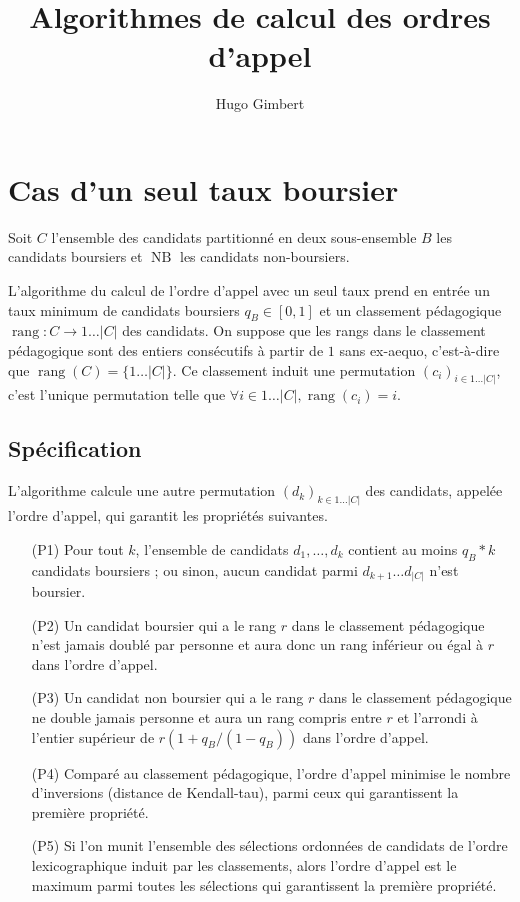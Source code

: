 \documentclass{article}
\DeclareMathOperator{\rang}{rang}
\DeclareMathOperator{\NB}{NB}
\begin{document}
\title{Algorithmes de calcul des ordres d'appel}
\author{Hugo Gimbert}
\maketitle


\section{Cas d'un seul taux boursier}

Soit $C$ l'ensemble des candidats partitionné en deux sous-ensemble
$B$ les candidats boursiers et $\NB$ les candidats non-boursiers.

L'algorithme du calcul de l'ordre d'appel avec un seul taux
prend en entrée un taux minimum de candidats boursiers
$q_B\in [0,1]$
et
un classement pédagogique $\rang:C \to 1\ldots |C|$
des candidats.
On suppose que les rangs dans le classement pédagogique
sont des entiers consécutifs à partir de $1$
sans ex-aequo, c'est-à-dire que $\rang(C)=\{1\ldots |C|\}$.
Ce classement induit une permutation $(c_i)_{i\in 1\ldots |C|}$,
c'est l'unique permutation telle que $\forall i\in 1\ldots |C|, \rang(c_i) = i$.


\subsection{Spécification}


L'algorithme calcule  une autre permutation
$(d_k)_{k\in 1\ldots |C|}$ des candidats, appelée l'ordre d'appel,
qui garantit les propriétés suivantes.
\begin{itemize}
 \item[(P1)]
 Pour tout $k$, l'ensemble de candidats $d_1,\ldots,d_k$ contient au moins $q_B  * k$  candidats boursiers ; ou sinon, aucun candidat parmi $d_{k+1}\ldots d_{|C|}$ n'est boursier. 
 \item[(P2)]
Un candidat boursier qui a le rang $r$ dans le classement pédagogique n’est jamais doublé par personne et aura donc un rang inférieur ou égal à $r$ dans l’ordre d’appel.
\item[(P3)]
Un candidat non boursier qui a le rang $r$ dans le classement pédagogique ne double jamais personne et aura un rang compris entre $r$ et l'arrondi à l'entier supérieur de $r(1 + q_B / (1 - q_B) )$ dans l’ordre d’appel. 
\item[(P4)]
Comparé au classement pédagogique, l’ordre d’appel minimise le nombre d’inversions (distance de Kendall-tau), parmi ceux qui garantissent la première propriété. 
\item[(P5)]
Si l’on munit l’ensemble des sélections ordonnées de candidats de l’ordre lexicographique induit par les classements, alors l’ordre d’appel est le maximum parmi toutes les sélections qui garantissent la première propriété.
\end{itemize}
\end{document}
